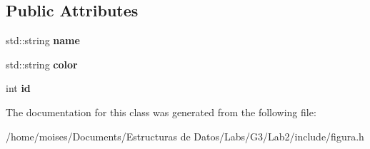 \subsection*{Public Attributes}
\begin{DoxyCompactItemize}
\item 
\mbox{\label{classfigura_a050e88ae9de6b6c82bcad928524ed8f5}} 
std\+::string {\bfseries name}
\item 
\mbox{\label{classfigura_a2b187914ec19e6353658a6f8a6153623}} 
std\+::string {\bfseries color}
\item 
\mbox{\label{classfigura_a9cad6950721567dbd8655f941b373f38}} 
int {\bfseries id}
\end{DoxyCompactItemize}


The documentation for this class was generated from the following file\+:\begin{DoxyCompactItemize}
\item 
/home/moises/\+Documents/\+Estructuras de Datos/\+Labs/\+G3/\+Lab2/include/figura.\+h\end{DoxyCompactItemize}
